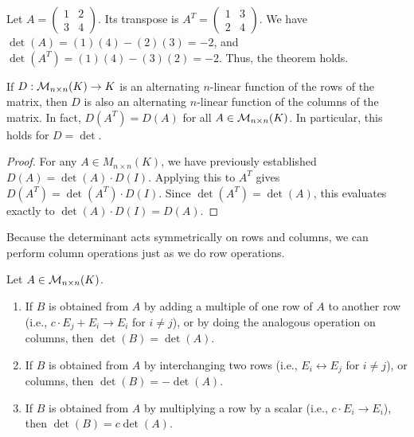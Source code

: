 \begin{example}
  Let $A = \left(\begin{smallmatrix} 1 & 2 \\ 3 & 4 \end{smallmatrix}\right)$. Its transpose is $A^T = \left(\begin{smallmatrix} 1 & 3 \\ 2 & 4 \end{smallmatrix}\right)$. We have $\det(A) = (1)(4) - (2)(3) = -2$, and $\det(A^T) = (1)(4) - (3)(2) = -2$. Thus, the theorem holds.
\end{example}

\begin{corollary}
  \label{cor:det_columns}
  If $D : \mathcal{M}_{n \times n}(K) \to K$ is an alternating $n$-linear function of the rows of the matrix, then $D$ is also an alternating $n$-linear function of the columns of the matrix. In fact, $D(A^T) = D(A)$ for all $A \in \mathcal{M}_{n \times n}(K)$. In particular, this holds for $D = \det$.
\end{corollary}

\begin{proof}
  For any $A \in M_{n \times n}(K)$, we have previously established $D(A) = \det(A) \cdot D(I)$. Applying this to $A^T$ gives $D(A^T) = \det(A^T) \cdot D(I)$. Since $\det(A^T) = \det(A)$, this evaluates exactly to $\det(A) \cdot D(I) = D(A)$.
\end{proof}

Because the determinant acts symmetrically on rows and columns, we can perform column operations just as we do row operations.

\begin{theorem}
  \label{thm:row_operations}
  Let $A \in \mathcal{M}_{n \times n}(K)$.
  \begin{enumerate}
    \item If $B$ is obtained from $A$ by adding a multiple of one row of $A$ to another row (i.e., $c \cdot E_j + E_i \to E_i$ for $i \neq j$), or by doing the analogous operation on columns, then $\det(B) = \det(A)$.
    \item If $B$ is obtained from $A$ by interchanging two rows (i.e., $E_i \leftrightarrow E_j$ for $i \neq j$), or columns, then $\det(B) = -\det(A)$.
    \item If $B$ is obtained from $A$ by multiplying a row by a scalar (i.e., $c \cdot E_i \to E_i$), then $\det(B) = c \det(A)$.
  \end{enumerate}
\end{theorem}

